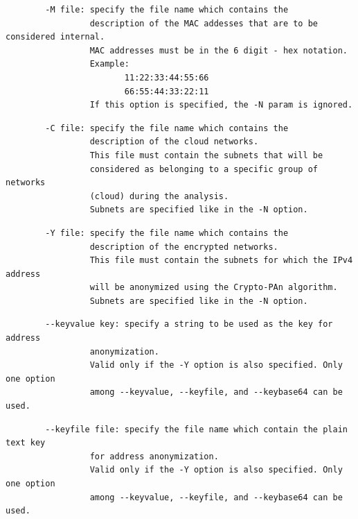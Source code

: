 \documentclass[11pt]{article}
\begin{document}
\begin{small}\begin{verbatim}
        -M file: specify the file name which contains the
                 description of the MAC addesses that are to be considered internal.
                 MAC addresses must be in the 6 digit - hex notation.
                 Example:
                        11:22:33:44:55:66 
                        66:55:44:33:22:11 
                 If this option is specified, the -N param is ignored.
\end{verbatim}\end{small} \noindent
\begin{small}\begin{verbatim}
        -C file: specify the file name which contains the
                 description of the cloud networks.
                 This file must contain the subnets that will be
                 considered as belonging to a specific group of networks
                 (cloud) during the analysis.
                 Subnets are specified like in the -N option.
\end{verbatim}\end{small} \noindent
\begin{small}\begin{verbatim}
        -Y file: specify the file name which contains the
                 description of the encrypted networks.  
                 This file must contain the subnets for which the IPv4 address
                 will be anonymized using the Crypto-PAn algorithm.            
                 Subnets are specified like in the -N option.
\end{verbatim}\end{small} \noindent
\begin{small}\begin{verbatim}
        --keyvalue key: specify a string to be used as the key for address
                 anonymization.                                           
                 Valid only if the -Y option is also specified. Only one option
                 among --keyvalue, --keyfile, and --keybase64 can be used.
\end{verbatim}\end{small} \noindent
\begin{small}\begin{verbatim}
        --keyfile file: specify the file name which contain the plain text key
                 for address anonymization.                                   
                 Valid only if the -Y option is also specified. Only one option
                 among --keyvalue, --keyfile, and --keybase64 can be used.
\end{verbatim}\end{small} \noindent
\end{document}
